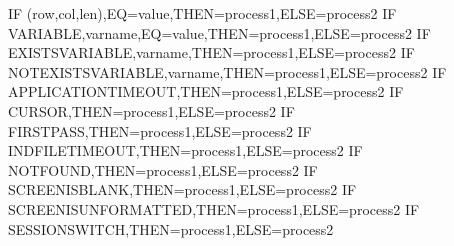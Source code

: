 \documentclass[letterpaper,10pt,english]{sphinxmanual}
\begin{document}
\begin{sphinxVerbatim}[commandchars=\\\{\}]
IF\PYGZdl{} (row,col,len),EQ=\PYGZsq{}value\PYGZsq{},THEN=process1,ELSE=process2
IF\PYGZdl{} VARIABLE,\PYGZsq{}varname\PYGZsq{},EQ=\PYGZsq{}value\PYGZsq{},THEN=process1,ELSE=process2
IF\PYGZdl{} EXISTS\PYGZhy{}VARIABLE,\PYGZsq{}varname\PYGZsq{},THEN=process1,ELSE=process2
IF\PYGZdl{} NOT\PYGZhy{}EXISTS\PYGZhy{}VARIABLE,\PYGZsq{}varname\PYGZsq{},THEN=process1,ELSE=process2
IF\PYGZdl{} APPLICATION\PYGZhy{}TIMEOUT,THEN=process1,ELSE=process2
IF\PYGZdl{} CURSOR,THEN=process1,ELSE=process2
IF\PYGZdl{} FIRST\PYGZhy{}PASS,THEN=process1,ELSE=process2
IF\PYGZdl{} IND\PYGZdl{}FILE\PYGZhy{}TIMEOUT,THEN=process1,ELSE=process2
IF\PYGZdl{} NOT\PYGZhy{}FOUND,THEN=process1,ELSE=process2
IF\PYGZdl{} SCREEN\PYGZhy{}IS\PYGZhy{}BLANK,THEN=process1,ELSE=process2
IF\PYGZdl{} SCREEN\PYGZhy{}IS\PYGZhy{}UNFORMATTED,THEN=process1,ELSE=process2
IF\PYGZdl{} SESSION\PYGZhy{}SWITCH,THEN=process1,ELSE=process2
\end{sphinxVerbatim}
\end{document}
